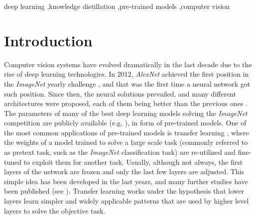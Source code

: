 \documentclass{elsarticle}
\begin{document}
\begin{frontmatter}
		\begin{keyword}
			deep learning \sep knowledge distillation \sep pre-trained models \sep computer vision
		\end{keyword}

	\end{frontmatter}

	\linenumbers

	\section{Introduction}
	Computer vision systems have evolved dramatically in the last decade due to the rise of deep learning technologies. In 2012, \textit{AlexNet} \citep{krizhevsky2012} achieved the first position in the \textit{ImageNet} yearly challenge \citep{ILSVRC15}, and that was the first time a neural network got such position. Since then, the neural solutions prevailed, and many different architectures were proposed, each of them being better than the previous ones \citep{khan2020, algan2021}. The parameters of many of the best deep learning models solving the \textit{ImageNet} competition are publicly available (e.g. \cite{he2016, chollet2017, szegedy2016, szegedy2017, howard2017, pham2018, tan2019}), in form of pre-trained models. One of the most common applications of pre-trained models is transfer learning \citep{huang2021}, where the weights of a model  trained to solve a large scale task (commonly referred to as pretext task, such as the \textit{ImageNet} classification task) are re-utilized and fine-tuned to exploit them for another task. Usually, although not always, the first layers of the network are frozen and only the last few layers 
	are adjusted. This simple idea has been developed in the last years, and many further studies have been published (see \citep{evci2022, zhu2018, wu2021, pzhao2021}). Transfer learning works under the hypothesis that lower layers learn simpler and widely applicable patterns that are used by higher level layers to solve the objective task.
\end{document}
